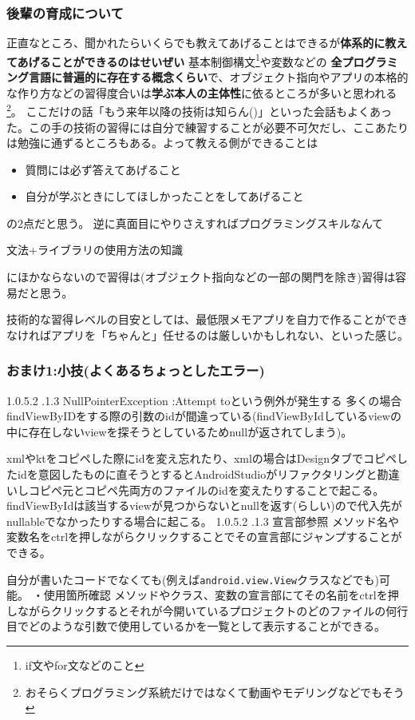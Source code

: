 \documentclass[dvipdfmx,jb5]{jarticle}
\makeatletter
\newcommand{\subsubsubsection}{\@startsection{paragraph}{4}{\z@}%
    {1.0\Cvs \@plus.5\Cdp \@minus.2\Cdp}%
    {.1\Cvs \@plus.3\Cdp}%
    {\large \bfseries}
  }
\makeatother
\begin{document}
\subsubsection{後輩の育成について}
正直なところ、聞かれたらいくらでも教えてあげることはできるが\textbf{\gtfamily 体系的に教えてあげることができるのはせいぜい} 基本制御構文\footnote{if文やfor文などのこと}や変数などの
\textbf{\gtfamily 全プログラミング言語に普遍的に存在する概念くらい}で、オブジェクト指向やアプリの本格的な作り方などの習得度合いは\textbf{\gtfamily 学ぶ本人の主体性}に依るところが多いと思われる\footnote{おそらくプログラミング系統だけではなくて動画やモデリングなどでもそう}。
ここだけの話「もう来年以降の技術は知らん()」といった会話もよくあった。この手の技術の習得には自分で練習することが必要不可欠だし、ここあたりは勉強に通ずるところもある。よって教える側ができることは
 \begin{itemize}
 \item 質問には必ず答えてあげること
 \item 自分が学ぶときにしてほしかったことをしてあげること
 \end{itemize}
の2点だと思う。
逆に真面目にやりさえすればプログラミングスキルなんて\par
文法+ライブラリの使用方法の知識\par
にほかならないので習得は(オブジェクト指向などの一部の関門を除き)習得は容易だと思う。\par
技術的な習得レベルの目安としては、最低限メモアプリを自力で作ることができなければアプリを「ちゃんと」任せるのは厳しいかもしれない、といった感じ。
 \subsubsection{おまけ1:小技(よくあるちょっとしたエラー)}
 \subsubsubsection{NullPointerException :Attempt toという例外が発生する}
 多くの場合findViewByIDをする際の引数のidが間違っている(findViewByIdしているviewの中に存在しないviewを探そうとしているためnullが返されてしまう)。\par
xmlやktをコピペした際にidを変え忘れたり、xmlの場合はDesignタブでコピペしたidを意図したものに直そうとするとAndroidStudioがリファクタリングと勘違いしコピペ元とコピペ先両方のファイルのidを変えたりすることで起こる。findViewByIdは該当するviewが見つからないとnullを返す(らしい)ので代入先がnullableでなかったりする場合に起こる。
 \subsubsubsection{宣言部参照}
 メソッド名や変数名をctrlを押しながらクリックすることでその宣言部にジャンプすることができる。\par
自分が書いたコードでなくても(例えば\texttt{android.view.View}クラスなどでも)可能。
・使用箇所確認
メソッドやクラス、変数の宣言部にてその名前をctrlを押しながらクリックするとそれが今開いているプロジェクトのどのファイルの何行目でどのような引数で使用しているかを一覧として表示することができる。
\end{document}
